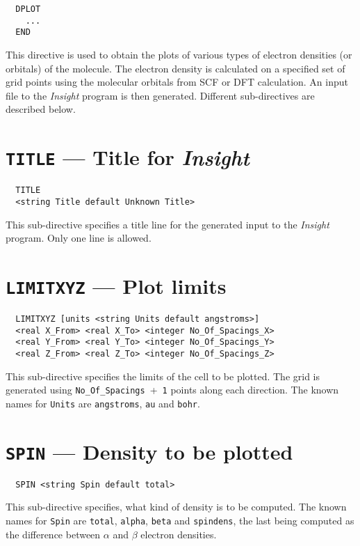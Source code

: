 \label{sec:dplot}
\begin{verbatim}
  DPLOT
    ...
  END
\end{verbatim}

This directive is used to obtain the plots of various types of electron
densities (or orbitals) of the molecule. The electron density is calculated
on a specified set of grid points using the molecular orbitals
from SCF or DFT calculation. An input file to the {\em Insight}
program is then generated. Different sub-directives are described below.

\section{{\tt TITLE} --- Title for {\em Insight}}

\begin{verbatim}
  TITLE
  <string Title default Unknown Title>
\end{verbatim}

This sub-directive specifies a title line for the generated
input to the {\em Insight} program. Only one line is allowed.

\section{{\tt LIMITXYZ} --- Plot limits}

\begin{verbatim}
  LIMITXYZ [units <string Units default angstroms>]
  <real X_From> <real X_To> <integer No_Of_Spacings_X>
  <real Y_From> <real Y_To> <integer No_Of_Spacings_Y>
  <real Z_From> <real Z_To> <integer No_Of_Spacings_Z>
\end{verbatim}

This sub-directive specifies the limits of the cell to be plotted.
The grid is generated using \verb+No_Of_Spacings+~+~\verb+1+ points
along each direction. The known names for \verb+Units+ are
\verb+angstroms+, \verb+au+ and \verb+bohr+.



\section{{\tt SPIN} --- Density to be plotted}

\begin{verbatim}
  SPIN <string Spin default total>
\end{verbatim}

This sub-directive specifies, what kind of density is to be computed. The 
known names for \verb+Spin+ are \verb+total+, \verb+alpha+, \verb+beta+
and \verb+spindens+, the last being computed as the difference between
$\alpha$ and $\beta$ electron densities.



